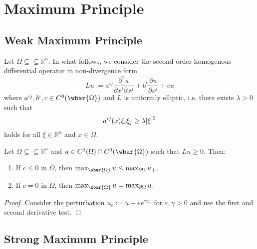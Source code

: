 \section*{Maximum Principle}
\subsection*{Weak Maximum Principle}

Let $\Omega \subseteq \subseteq \mathbb{R}^n$. In what follows, we consider the second order homogenous differential operator in non-divergence form
\begin{equation*}
	Lu := a^{ij}\frac{\partial^2u}{\partial x^i \partial x^j} + b^i \frac{\partial u}{\partial x^i} + c u
\end{equation*}
\noindent where $a^{ij},b^i,c \in C^0(\wbar{\Omega})$ and $L$ is uniformly elliptic, i.e. there exists $\lambda > 0$ such that
\begin{equation*}
	a^{ij}(x)\xi_i\xi_j \geq \lambda \abs{\xi}^2
\end{equation*}
\noindent holds for all $\xi \in \mathbb{R}^n$ and $x \in \Omega$.

\begin{theorem}
	\label{thm:WMP}
	Let $\Omega \subseteq \subseteq \mathbb{R}^n$ and $u \in C^2(\Omega) \cap C^0(\wbar{\Omega})$ such that $Lu \geq 0$. Then:
	\begin{enumerate}[label = \textup{(}\alph*\textup{)},wide = 0pt]
		\item If $c \leq 0$ in $\Omega$, then $\max_{\wbar{\Omega}} u \leq \max_{\partial \Omega} u_+$.
		\item If $c = 0$ in $\Omega$, then $\max_{\wbar{\Omega}} u = \max_{\partial \Omega} u$.
	\end{enumerate}
\end{theorem}

\begin{proof}
	Consider the perturbation $u_\varepsilon := u + \varepsilon e^{\gamma x_1}$ for $\varepsilon,\gamma > 0$ and use the first and second derivative test.
\end{proof}

\subsection*{Strong Maximum Principle}

